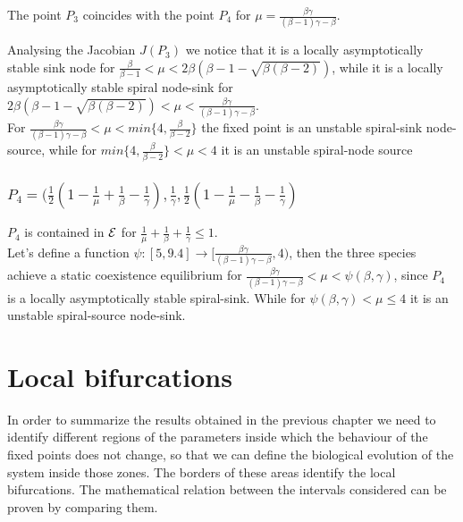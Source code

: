 \documentclass[10pt]{Configuration_Files/PoliMi3i_thesis}
\begin{document}
The point $P_3$ coincides with the point $P_4$ for $\mu=\frac{\beta \gamma}{(\beta-1)\gamma -\beta}$.

Analysing the Jacobian $J(P_3)$ we notice that it is a locally asymptotically stable sink node for $\frac{\beta}{\beta-1} < \mu < 2 \beta (\beta -1 - \sqrt{\beta(\beta -2)})$, while it is a locally asymptotically stable spiral node-sink for $2 \beta (\beta -1 - \sqrt{\beta(\beta -2)}) < \mu < \frac{\beta \gamma}{(\beta-1)\gamma -\beta}$. \\
For $\frac{\beta \gamma}{(\beta-1)\gamma -\beta} < \mu < min\{4, \frac{\beta}{\beta-2}\}$ the fixed point is an unstable spiral-sink node-source, while for $min\{4, \frac{\beta}{\beta-2}\} < \mu < 4$ it is an unstable spiral-node source


\subsection{$P_4 = (\frac{1}{2}(1-\frac{1}{\mu}+\frac{1}{\beta}-\frac{1}{\gamma}), \frac{1}{\gamma}, \frac{1}{2}(1-\frac{1}{\mu}-\frac{1}{\beta}-\frac{1}{\gamma})$}

$P_4$ is contained in $\mathcal{E}$ for $\frac{1}{\mu}+\frac{1}{\beta}+\frac{1}{\gamma}\leq 1$.\\
Let's define a function $\psi:[5,9.4]\to[\frac{\beta \gamma}{(\beta-1)\gamma -\beta},4)$, then the three species achieve a static coexistence equilibrium for $\frac{\beta \gamma}{(\beta-1)\gamma -\beta} < \mu < \psi(\beta,\gamma)$, since $P_4$ is a locally asymptotically stable spiral-sink. While for $ \psi(\beta,\gamma) < \mu \le 4$ it is an unstable spiral-source node-sink.


\chapter{Local bifurcations}
In order to summarize the results obtained in the previous chapter we need to identify different regions of the parameters inside which the behaviour of the fixed points does not change, so that we can define the biological evolution of the system inside those zones. The borders of these areas identify the local bifurcations. The mathematical relation between the intervals considered can be proven by comparing them.
\end{document}
